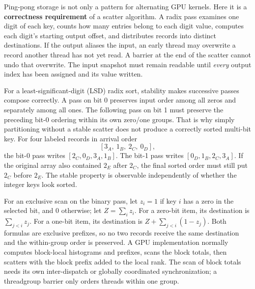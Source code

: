 \hypertarget{03-visual-computing-i-ch016-first-use-completion-a-stable-radix-pass-is-a-permutation-not-an-in-place-edit}{}

Ping-pong storage is not only a pattern for alternating GPU kernels. Here it is a \textbf{correctness requirement} of a scatter algorithm. A radix pass examines one digit of each key, counts how many entries belong to each digit value, computes each digit's starting output offset, and distributes records into distinct destinations. If the output aliases the input, an early thread may overwrite a record another thread has not yet read. A barrier at the end of the scatter cannot undo that overwrite. The input snapshot must remain readable until \emph{every} output index has been assigned and its value written.

For a least-significant-digit (LSD) radix sort, stability makes successive passes compose correctly. A pass on bit 0 preserves input order among all zeros and separately among all ones. The following pass on bit 1 must preserve the preceding bit-0 ordering within its own zero/one groups. That is why simply partitioning without a stable scatter does not produce a correctly sorted multi-bit key. For four labeled records in arrival order \[
[3_A,\ 1_B,\ 2_C,\ 0_D],
\] the bit-0 pass writes \([2_C,0_D,3_A,1_B]\). The bit-1 pass writes \([0_D,1_B,2_C,3_A]\). If the original array also contained \(2_E\) after \(2_C\), the final sorted order must still put \(2_C\) before \(2_E\). The stable property is observable independently of whether the integer keys look sorted.

For an exclusive scan on the binary pass, let \(z_i=1\) if key \(i\) has a zero in the selected bit, and \(0\) otherwise; let \(Z=\sum_i z_i\). For a zero-bit item, its destination is \(\sum_{j<i}z_j\). For a one-bit item, its destination is \(Z+\sum_{j<i}(1-z_j)\). Both formulas are exclusive prefixes, so no two records receive the same destination and the within-group order is preserved. A GPU implementation normally computes block-local histograms and prefixes, scans the block totals, then scatters with the block prefix added to the local rank. The scan of block totals needs its own inter-dispatch or globally coordinated synchronization; a threadgroup barrier only orders threads within one group.

